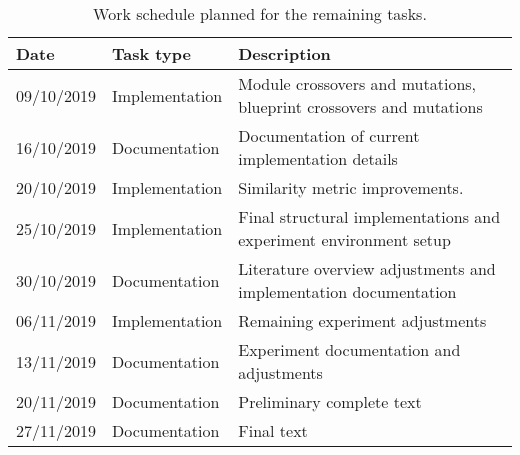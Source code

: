 \documentclass[12pt]{article}
\begin{document}
\begin{table}[h]
    \begin{tabular}{ |p{2cm}|p{3cm}|p{8cm}| } 
        \hline
        Date & Task type & Description
        \\
        \hline
        09/10/2019 &
        Implementation   &
        Module crossovers and mutations, blueprint crossovers and mutations
        \\
        \hline
        16/10/2019 &
        Documentation  &
        Documentation of current implementation details
        \\
        \hline
        20/10/2019 &
        Implementation  &
        Similarity metric improvements.\\
        \hline
        25/10/2019 &
        Implementation  &
        Final structural implementations and experiment environment setup\\
        \hline
        30/10/2019 &
        Documentation  &
        Literature overview adjustments and implementation documentation\\
        \hline
        06/11/2019 &
        Implementation  &
        Remaining experiment adjustments\\
        \hline
        13/11/2019 &
        Documentation  &
        Experiment documentation and adjustments\\
        \hline
        20/11/2019 &
        Documentation  &
        Preliminary complete text\\
        \hline
        27/11/2019 &
        Documentation  &
        Final text\\
        \hline
    \end{tabular}
    \caption{Work schedule planned for the remaining tasks.}
    \label{table:workschedule}
\end{table}



\end{document}
